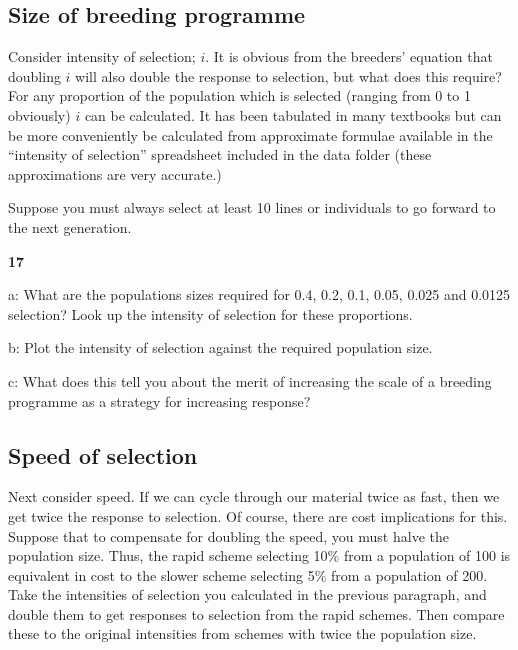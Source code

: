 \documentclass[
]{book}
\makeatletter
\newenvironment{kframe}{%
\medskip{}
\setlength{\fboxsep}{.8em}
 \def\at@end@of@kframe{}%
 \ifinner\ifhmode%
  \def\at@end@of@kframe{\end{minipage}}%
  \begin{minipage}{\columnwidth}%
 \fi\fi%
 \def\FrameCommand##1{\hskip\@totalleftmargin \hskip-\fboxsep
 \colorbox{shadecolor}{##1}\hskip-\fboxsep
     \hskip-\linewidth \hskip-\@totalleftmargin \hskip\columnwidth}%
 \MakeFramed {\advance\hsize-\width
   \@totalleftmargin\z@ \linewidth\hsize
   \@setminipage}}%
 {\par\unskip\endMakeFramed%
 \at@end@of@kframe}
\newenvironment{rmdblock}[1]
  {
  \begin{itemize}
  \renewcommand{\labelitemi}{
    \raisebox{-.7\height}[0pt][0pt]{
      {\setkeys{Gin}{width=3em,keepaspectratio}\texttt{[image: images/\#1]}}
    }
  }
  \setlength{\fboxsep}{1em}
  \begin{kframe}
  \item
  }
  {
  \end{kframe}
  \end{itemize}
  }
\newenvironment{rmdquiz}
  {\begin{rmdblock}{quiz}}
  {\end{rmdblock}}
\makeatother
\begin{document}
\hypertarget{size-of-breeding-programme}{%
\subsection{Size of breeding programme}\label{size-of-breeding-programme}}

Consider intensity of selection; \(i\). It is obvious from the breeders' equation that doubling \(i\) will also double the response to selection, but what does this require? For any proportion of the population which is selected (ranging from 0 to 1 obviously) \(i\) can be calculated. It has been tabulated in many textbooks but can be more conveniently be calculated from approximate formulae available in the ``intensity of selection'' spreadsheet included in the data folder (these approximations are very accurate.)

Suppose you must always select at least 10 lines or individuals to go forward to the next generation.

\begin{rmdquiz}
\textbf{17}

a: What are the populations sizes required for 0.4, 0.2, 0.1, 0.05, 0.025 and 0.0125 selection? Look up the intensity of selection for these proportions.

b: Plot the intensity of selection against the required population size.

c: What does this tell you about the merit of increasing the scale of a breeding programme as a strategy for increasing response?
\end{rmdquiz}

\hypertarget{speed-of-selection}{%
\subsection{Speed of selection}\label{speed-of-selection}}

Next consider speed. If we can cycle through our material twice as fast, then we get twice the response to selection. Of course, there are cost implications for this. Suppose that to compensate for doubling the speed, you must halve the population size. Thus, the rapid scheme selecting 10\% from a population of 100 is equivalent in cost to the slower scheme selecting 5\% from a population of 200. Take the intensities of selection you calculated in the previous paragraph, and double them to get responses to selection from the rapid schemes. Then compare these to the original intensities from schemes with twice the population size.
\end{document}
